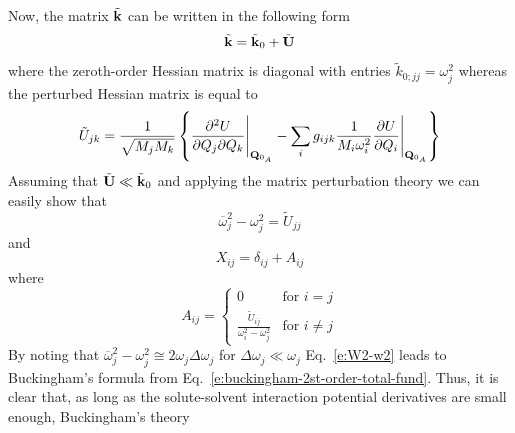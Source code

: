 \documentclass[b5paper,oneside,fleqn,11pt]{book}
\newcommand{\fderiv}[2]{\ensuremath{
    \frac{\partial #1}{\partial #2}}}
\newcommand{\sderivd}[3]{\ensuremath{
    \frac{\partial^2 #1}{\partial #2 \partial #3}
    }}
\begin{document}
\begin{refsection}
Now, 
the matrix $\tilde{\bf k}$ can be written
in the following form
%
\begin{equation} \label{e:jeden}
 \tilde{\bf k} = \tilde{\bf k}_0 + \tilde{\bf U}
\end{equation}
%
where the zeroth\hyp{}order Hessian matrix is diagonal
with entries $\tilde{k}_{0;jj}=\omega_j^2$ whereas
the perturbed Hessian matrix is equal to
%
\begin{equation}  \label{e:trzybulak}
 \tilde{U}_{jk} = \frac{1}{\sqrt{M_jM_k}} \left\{
            \sderivd{U}{Q_j}{Q_k}  \Bigg|_{{\bf Q}_{0_A}} 
           - \sum_i g_{ijk} \frac{1}{M_i\omega_i^2}\fderiv{U}{Q_i} \Bigg|_{{\bf Q}_{0_A}} 
           \right\}
\end{equation}
%
Assuming that $\tilde{\bf U}\ll \tilde{\bf k}_0$ and applying the
matrix perturbation theory we can easily show that
%
\begin{equation} \label{e:W2-w2}
 \overline{\omega}_j^2 - {\omega}_j^2 = 
 \tilde{U}_{jj}
\end{equation}
%
and
%
\begin{equation}
 X_{ij} = \delta_{ij} + A_{ij}
\end{equation}
%
where
%
\begin{equation}
 A_{ij} = 
\left\{\begin{matrix}
0 &\text{for $i=j$}\\ 
\frac{\tilde{U}_{ij}}{\omega_i^2-\omega_j^2} &\text{for $i\ne j$}
\end{matrix}\right.
\end{equation}
%
By noting that $\overline{\omega}_j^2 - {\omega}_j^2 \cong 2\omega_j\Delta\omega_j$
for $\Delta\omega_j\ll \omega_j$ Eq.~\eqref{e:W2-w2} leads
to Buckingham's formula from Eq.~\eqref{e:buckingham-2st-order-total-fund}.
Thus, it is clear that, as long as the solute\hyp{}solvent
interaction potential derivatives are small enough, Buckingham's theory

\end{refsection}
\end{document}
